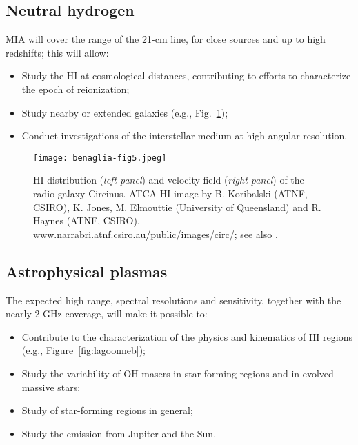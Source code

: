 \documentclass[baaa]{baaa}
\begin{document}


\subsection{Neutral hydrogen}

MIA will cover the range of the 21-cm line, for close sources and up to high redshifts; this will allow:

\begin{itemize}
\item Study the HI at cosmological distances, contributing to efforts  to characterize the epoch of reionization; 
\item Study nearby or extended galaxies (e.g., Fig.~\ref{fig:circinus}); 
\item Conduct investigations of the interstellar medium at high angular resolution.
\end{itemize}

\begin{figure}[!h]
\centering
\texttt{[image: benaglia-fig5.jpeg]}
\caption{HI distribution (\emph{left panel}) and velocity field (\emph{right panel}) of the radio galaxy Circinus. ATCA HI image by B. Koribalski (ATNF, CSIRO), K. Jones, M. Elmouttie (University of Queensland) and R. Haynes (ATNF, CSIRO), \url{www.narrabri.atnf.csiro.au/public/images/circ/}; see also \citet{koribal2018}.}
\label{fig:circinus}
\end{figure}

\subsection{Astrophysical plasmas}

The expected high range, spectral resolutions and sensitivity, together with the nearly 2-GHz coverage, will make it possible to: 

\begin{itemize}
\item Contribute to the characterization of the physics and kinematics of HI regions (e.g., Figure~\ref{fig:lagoonneb});
\item Study the variability of OH masers in star-forming regions and in evolved massive stars;
\item Study of star-forming regions in general; 
\item Study the emission from Jupiter and the Sun.
\end{itemize}
\end{document}
